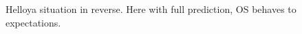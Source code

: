 \begin{figure}[ht]
\begin{subfigure}[b]{0.499\textwidth}
    \end{subfigure}
    \hfill
    \caption{Helloya situation in reverse. Here with full prediction, \gls{OS} behaves to expectations.}
\end{figure}

